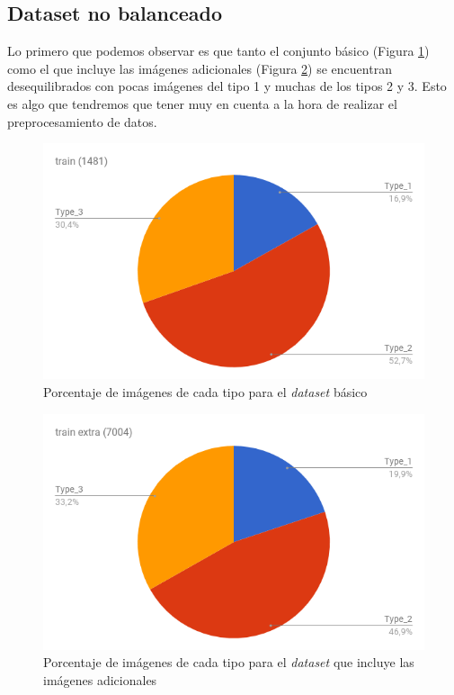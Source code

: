 \subsection{Dataset no balanceado}

Lo primero que podemos observar es que tanto el conjunto básico (Figura \ref{fig:num-images-train-dataset}) como el que incluye las imágenes adicionales (Figura \ref{fig:num-images-train-extra-dataset}) se encuentran desequilibrados con pocas imágenes del tipo 1 y muchas de los tipos 2 y 3. Esto es algo que tendremos que tener muy en cuenta a la hora de realizar el preprocesamiento de datos.

\begin{figure}[H]
	\centering
	\includegraphics[width=12cm]{img/num-images-train-dataset}
	\caption{Porcentaje de imágenes de cada tipo para el \textit{dataset} básico}
	\label{fig:num-images-train-dataset}
\end{figure}

\begin{figure}[H]
\centering
\includegraphics[width=12cm]{img/num-images-train-extra-dataset}
\caption{Porcentaje de imágenes de cada tipo para el \textit{dataset} que incluye las imágenes adicionales}
\label{fig:num-images-train-extra-dataset}
\end{figure}

